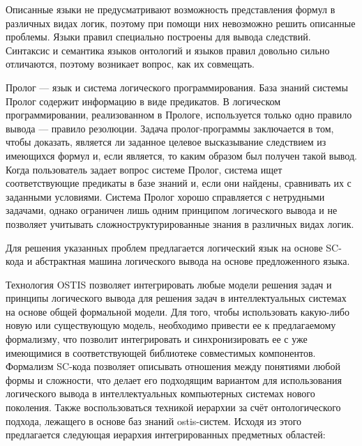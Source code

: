Описанные языки не предусматривают возможность представления формул в различных видах логик, поэтому при помощи них невозможно решить описанные проблемы. Языки правил специально построены для вывода следствий. Синтаксис и семантика языков онтологий и языков правил довольно сильно отличаются, поэтому возникает вопрос, как их совмещать. 

Пролог --- язык и система логического программирования. База знаний системы Пролог содержит информацию в виде предикатов. В логическом программировании, реализованном в Прологе, используется только одно правило вывода --- правило резолюции. Задача пролог-программы заключается в том, чтобы доказать, является ли заданное целевое высказывание следствием из имеющихся формул и, если является, то каким образом был получен такой вывод. Когда пользователь задает вопрос системе Пролог, система ищет соответствующие предикаты в базе знаний и, если они найдены, сравнивать их с заданными условиями. Система Пролог хорошо справляется с нетрудными задачами, однако ограничен лишь одним принципом логического вывода и не позволяет учитывать сложноструктурированные знания в различных видах логик.

Для решения указанных проблем предлагается логический язык на основе SC-кода и абстрактная машина логического вывода на основе предложенного языка. 

Технология OSTIS позволяет интегрировать любые модели решения задач и принципы логического вывода для решения задач в интеллектуальных системах на основе общей формальной модели. Для того, чтобы использовать какую-либо новую или существующую модель, необходимо привести ее к предлагаемому формализму, что позволит интегрировать и синхронизировать ее с уже имеющимися в соответствующей библиотеке совместимых компонентов. Формализм SC-кода позволяет описывать отношения между понятиями любой формы и сложности, что делает его подходящим вариантом для использования логического вывода в интеллектуальных компьютерных системах нового поколения. Также воспользоваться техникой иерархии за счёт онтологического подхода, лежащего в основе баз знаний ostis-систем. Исходя из этого предлагается следующая иерархия интегрированных предметных областей:

